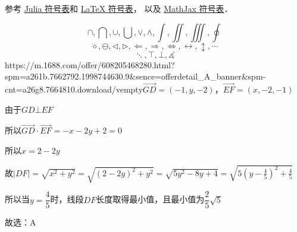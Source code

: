 
参考 \href{https://docs.julialang.org/en/v1/manual/unicode-input/}{Julia 符号表}和 \href{https://oeis.org/wiki/List_of_LaTeX_mathematical_symbols}{LaTeX 符号表}， 以及 \href{http://www.onemathematicalcat.org/MathJaxDocumentation/TeXSyntax.htm#U}{MathJax 符号表}．

\begin{equation}
\cap, \bigcap, \cup, \bigcup, \vee, \wedge, \int, \iint, \iiint, \oint
\end{equation}
\begin{equation}
\diamond, \ominus, \triangleleft, \triangleright, \Longleftarrow, \Longrightarrow, \iff, \leftrightarrow, \updownarrow, \cdots
\end{equation}
\begin{equation}
\ddots, \top, \bot, \measuredangle
\end{equation}
https://m.1688.com/offer/608205468280.html?spm=a261b.7662792.1998744630.9&sence=offerdetail_A_banner&spm-cnt=a26g8.7664810.download/vempty$\overrightarrow{GD}=\left(-1,y,-2\right)$，$\overrightarrow{EF}=\left(x,-2,-1\right)$

由于$GD\bot EF$

所以$\overrightarrow{GD}\cdot \overrightarrow{EF}=-x-2y+2=0$

所以$x=2-2y$

故$\left|DF\right|=\sqrt{{x}^{2}+{y}^{2}}=\sqrt{{\left(2-2y\right)}^{2}+{y}^{2}}$$=\sqrt{5 y^{2}-8 y+4}=\sqrt{5\left(y-\frac{4}{5}\right)^{2}+\frac{4}{5}}$

所以当$y=\dfrac{4}{5}$时，线段$DF$长度取得最小值，且最小值为$\dfrac{2}{5}\sqrt{5}$

故选：$\mathrm{A}$